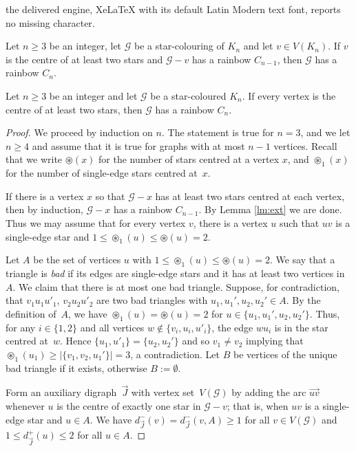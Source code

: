 \documentclass[10pt,a4paper]{amsart}
\def\cen{\circledast}
\newcommand{\ms}[1]{\mathscr{#1}}
\newcommand{\ova}[1]{\overrightarrow{#1}}
\begin{document}
the delivered engine, XeLaTeX with its default Latin Modern text font, reports no missing character.
\begin{lemma}\label{lm:ext}
Let $n \geq 3$ be an integer, let $\ms{G}$ be a star-colouring of $K_n$ and let $v\in V(K_n)$.
	If $v$ is the centre of at least two stars and $\ms{G}-v$ has a rainbow $C_{n-1}$, then $\ms{G}$ has a rainbow $C_n$. 
\end{lemma}

\begin{lemma}\label{lm:hamcycle}
Let $n \geq 3$ be an integer and let $\ms{G}$ be a star-coloured $K_n$.
	If every vertex is the centre of at least two stars, then $\ms{G}$ has a rainbow $C_n$. 
\end{lemma}

\begin{proof}
    We proceed by induction on $n$.
	The statement is true for $n=3$, and we let $n \geq 4$ and assume that it is true for graphs with at most $n-1$ vertices.
    Recall that we write $\cen(x)$ for the number of stars centred at a vertex $x$, and $\cen_1(x)$ for the number of single-edge stars centred at~$x$.

    If there is a vertex $x$ so that $\ms{G}-x$ has at least two stars centred at each vertex, then by induction, $\ms{G}-x$ has a rainbow $C_{n-1}$. By Lemma \ref{lm:ext} we are done.   
    Thus we may assume that for every vertex $v$, there is a vertex $u$ such that $uv$ is a single-edge star and $1 \leq \cen_1(u) \leq \cen(u)=2$.

    Let $A$ be the set of vertices $u$ with $1 \leq \cen_1(u) \leq \cen(u)=2$.
    We say that a triangle is \emph{bad} if its edges are single-edge stars and it has at least two vertices in $A$.
    We claim that there is at most one bad triangle. 
    Suppose, for contradiction, that $v_1u_1u'_1$, $v_2u_2u'_2$ are two bad triangles with $u_1,u_1',u_2,u_2' \in A$. 
    By the definition of~$A$, we have $\cen_1( u ) = \cen( u ) = 2$ for $u \in \{ u_1, u_1',u_2,u_2'\}$.
    Thus, for any $i \in \{ 1,2\}$ and all vertices $w \notin \{ v_i,u_i,u'_i\}$, the edge $w u_i$ is in the star centred at~$w$.
    Hence $\{u_1,u'_1\} = \{u_2,u_2'\}$ and so $ v_1 \ne v_2$ implying that $\cen_1(u_1) \ge |\{v_1,v_2, u_1'\}| = 3$, a contradiction. 
    Let $B$ be vertices of the unique bad triangle if it exists, otherwise $B := \emptyset$.


    Form an auxiliary digraph~$\ova{J}$ with vertex set~$V(\ms{G})$ by adding the arc $\ova{uv}$ whenever $u$ is the centre of exactly one star in $\ms{G}-v$; that is, when $uv$ is a single-edge star and $u \in A$.
    We have $d^-_{\ova{J}}(v) = d^-_{\ova{J}}(v,A) \geq 1$ for all $v \in V(\ms{G})$ and $1 \le d^+_{\ova{J}}(u) \le 2 $ for all $u \in A$. 
    

\end{proof}
\end{document}
